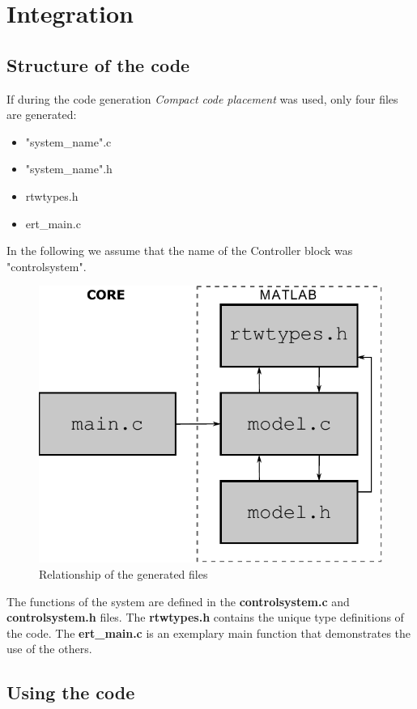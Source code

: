 \section{Integration}
\label{sec:integration}

\subsection{Structure of the code}

If during the code generation \emph{Compact code placement} was used, only four files are generated:

\begin{itemize}

    \item "system\_name".c
    \item "system\_name".h
    \item rtwtypes.h
    \item ert\_main.c

\end{itemize}

In the following we assume that the name of the Controller block was "controlsystem".

\begin{figure}[!ht]
    \centering
    \includegraphics[width=0.6\linewidth]{img/rtw}
    \caption{Relationship of the generated files}
    \label{fig:rtw}
\end{figure}

The functions of the system are defined in the \textbf{controlsystem.c} and \textbf{controlsystem.h} files. The \textbf{rtwtypes.h} contains the unique type definitions of the code. The \textbf{ert\_main.c} is an exemplary main function that demonstrates the use of the others.

\subsection{Using the code}

